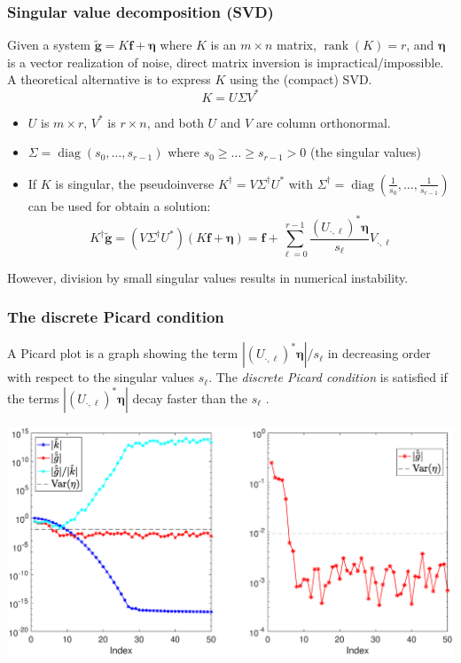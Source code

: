 \documentclass[t]{beamer}
\newcommand{\noise}{\eta}	%
\newcommand{\gnoiseVec}{\widetilde{\mathbf{g}}}	%
\newcommand{\kMat}{K}	%
\newcommand{\fVec}{\mathbf{f}}	%
\newcommand{\ctrans}{*}	%
\DeclareMathOperator{\diag}{diag}	%
\DeclareMathOperator{\rank}{rank}	%
\newcommand{\noiseVec}{\mathbf{\noise}}	%
\newcommand{\singular}{s}	%
\begin{document}
\begin{frame}
\frametitle{Singular value decomposition (SVD)}
Given a system $\gnoiseVec = \kMat\fVec + \noiseVec$ where $\kMat$ is an $m \times n$ matrix, $\rank(\kMat) = r$, and $\noiseVec$ is a vector realization of noise, direct matrix inversion is impractical/impossible. A theoretical alternative is to express $\kMat$ using the (compact) SVD.
\[\kMat = U\Sigma{V^\ctrans}\]
\begin{itemize}[nosep]
\item $U$ is $m \times r$, $V^\ctrans$ is $r \times n$, and both $U$ and $V$ are column orthonormal.
\item $\Sigma = \diag(\singular_0,\ldots,\singular_{r-1})$ where $s_0 \geq \ldots \geq \singular_{r-1} > 0$ (the singular values)
\item If $\kMat$ is singular, the pseudoinverse $K^\dagger = V\Sigma^\dagger{U}^\ctrans$ with $\Sigma^\dagger = \diag\left(\frac{1}{\singular_0},\ldots,\frac{1}{\singular_{r-1}}\right)$ can be used for obtain a solution:
\[\kMat^\dagger{\gnoiseVec} = (V\Sigma^\dagger{U}^\ctrans)(\kMat\fVec + \noiseVec) = \fVec + \sum_{\ell=0}^{r-1} \frac{(U_{\cdot,\ell})^\ctrans{\noiseVec}}{\singular_{\ell}}V_{\cdot,\ell}\]
\end{itemize}
However, division by small singular values results in numerical instability.
\end{frame}

\begin{frame}
\frametitle{The discrete Picard condition}
A Picard plot is a graph showing the term $|(U_{\cdot,\ell})^\ctrans{\noiseVec}|/\singular_{\ell}$ in decreasing order with respect to the singular values $\singular_{\ell}$. The \textit{discrete Picard condition} is satisfied if the terms $|(U_{\cdot,\ell})^\ctrans{\noiseVec}|$ decay faster than the $\singular_{\ell}$ \cite{ABT, Hansen1990}.
\begin{center}
\includegraphics[scale=0.25]{Figures/PicardPlot.eps}
\end{center}
\end{frame}
\end{document}
